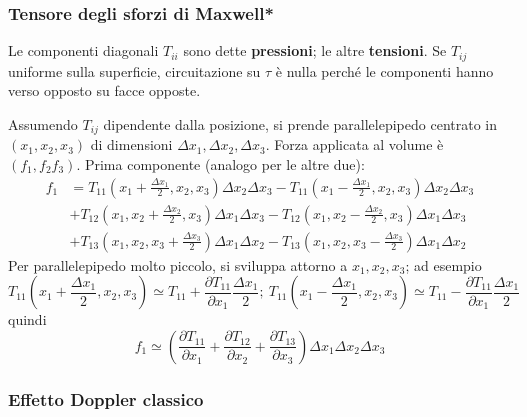 \documentclass[a4paper]{scrartcl}
\numberwithin{equation}{subsection}
\theoremstyle{style1}
\begin{document}
\subsubsection{Tensore degli sforzi di Maxwell*}
Le componenti diagonali $T_{ii} $ sono dette \textbf{pressioni}; le altre \textbf{tensioni}. Se $T_{ij} $ uniforme sulla superficie, circuitazione su $\tau $ \`e nulla perch\'e le componenti hanno verso opposto su facce opposte.

Assumendo $T_{ij} $ dipendente dalla posizione, si prende parallelepipedo centrato in $(x_1,x_2,x_3)$ di dimensioni $\Delta x_1, \Delta x_2, \Delta x_3$. Forza applicata al volume \`e $(f_1,f_2f_3)$. Prima componente (analogo per le altre due):
\[
\begin{split}
	f_1 &= T_{11}\left(x_1+ \frac{\Delta x_1}{2},x_2,x_3\right)  \Delta x_2\Delta x_3 -T_{11}\left(x_1- \frac{\Delta x_1}{2},x_2,x_3\right)  \Delta x_2\Delta x_3\\
	    &+ T_{12}\left(x_1,x_2+\frac{\Delta x_2}{2}, x_3 \right)\Delta x_1 \Delta x_3 - T_{12}\left(x_1,x_2-\frac{\Delta x_2}{2},x_3\right) \Delta x_1\Delta x_3   \\
	    &+T_{13} \left(x_1,x_2,x_3+\frac{\Delta x_3}{2}\right) \Delta x_1\Delta x_2 - T_{13} \left(x_1,x_2,x_3-\frac{\Delta x_3}{2}\right) \Delta x_1\Delta x_2
\end{split}
\] 
Per parallelepipedo molto piccolo, si sviluppa attorno a $x_1,x_2,x_3$; ad esempio
\[
T_{11}\left(x_1+\frac{\Delta x_1}{2}, x_2,x_3\right) \simeq T_{11} + \frac{\partial T_{11}}{\partial x_1} \frac{\Delta x_1}{2};\ T_{11}\left(x_1-\frac{\Delta x_1}{2}, x_2,x_3\right) \simeq T_{11} - \frac{\partial T_{11}}{\partial x_1} \frac{\Delta x_1}{2}
\] 
quindi
\begin{equation}
	f_1 \simeq \left(\frac{\partial T_{11}}{\partial x_1} +\frac{\partial T_{12}}{\partial x_2} +\frac{\partial T_{13}}{\partial x_3} \right) \Delta x_1\Delta x_2\Delta x_3
\end{equation}

\subsubsection{Effetto Doppler classico}
\end{document}
